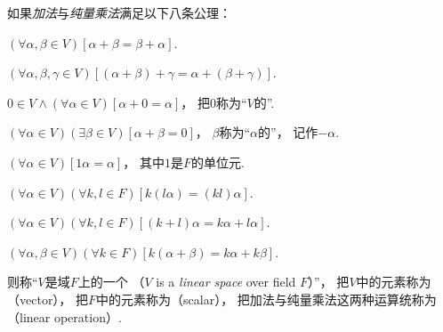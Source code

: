 \begin{definition}
如果\emph{加法}与\emph{纯量乘法}满足以下八条公理：
\begin{center}
	\begin{minipage}{.8\textwidth}
		\begin{axiom}\label{definition:线性空间.运算法则1}
		\((\forall\alpha,\beta\in V)
		[\alpha+\beta=\beta+\alpha]\).
		\end{axiom}
		\begin{axiom}\label{definition:线性空间.运算法则2}
		\((\forall\alpha,\beta,\gamma\in V)
		[(\alpha+\beta)+\gamma=\alpha+(\beta+\gamma)]\).
		\end{axiom}
		\begin{axiom}\label{definition:线性空间.运算法则3}
		\(0\in V
		\land
		(\forall\alpha \in V)
		[\alpha+0=\alpha]\)，
		把\(0\)称为“\(V\)的”.
		\end{axiom}
		\begin{axiom}\label{definition:线性空间.运算法则4}
		\((\forall\alpha \in V)
		(\exists\beta \in V)
		[\alpha+\beta=0]\)，
		\(\beta\)称为“\(\alpha\)的”，
		记作\(-\alpha\).
		\end{axiom}
		\begin{axiom}\label{definition:线性空间.运算法则5}
		\((\forall\alpha\in V)[1\alpha=\alpha]\)，
		其中\(1\)是\(F\)的单位元.
		\end{axiom}
		\begin{axiom}\label{definition:线性空间.运算法则6}
		\((\forall\alpha\in V)
		(\forall k,l\in F)
		[k(l\alpha)=(kl)\alpha]\).
		\end{axiom}
		\begin{axiom}\label{definition:线性空间.运算法则7}
		\((\forall\alpha\in V)
		(\forall k,l\in F)
		[(k+l)\alpha=k\alpha+l\alpha]\).
		\end{axiom}
		\begin{axiom}\label{definition:线性空间.运算法则8}
		\((\forall\alpha,\beta\in V)
		(\forall k\in F)
		[k(\alpha+\beta)=k\alpha+k\beta]\).
		\end{axiom}
	\end{minipage}
\end{center}
则称“\(V\)是域\(F\)上的一个%
（\(V\) is a \emph{linear space} over field \(F\)）”，
把\(V\)中的元素称为（vector），
把\(F\)中的元素称为（scalar），
把加法与纯量乘法这两种运算统称为（linear operation）.
\end{definition}
